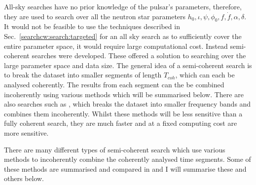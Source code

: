 All-sky searches have no prior knowledge of the pulsar's parameters, therefore,
they are used to search over all the neutron star parameters $h_0, \iota, \psi, \phi_0, f,
\dot{f}, \alpha, \delta$. It would not be feasible to use the techniques described in
Sec.~\ref{searchcw:search:targeted} for an all sky search as to sufficiently
cover the entire parameter space, it would require large computational cost.  Instead
semi-coherent searches were developed.  These offered a solution to searching over
the large parameter space and data size.  The general idea of a semi-coherent
search is to break the dataset into smaller segments of length $T_{coh}$, which
can each be analysed coherently. 
The results from each segment can the be combined incoherently using various methods which will be
summarised below.  
There are also searches such as \citep{messenger2007FastSearch}, which breaks the dataset into smaller frequency bands and combines them incoherently. 
Whilst these methods will be less sensitive than a fully coherent search, they are much faster and at a fixed computing cost are more sensitive.

There are many different types of semi-coherent search which use various
methods to incoherently combine the coherently analysed time segments.  Some of these methods are summarised and compared in
\citep{walsh2016ComparisonMethods} and I will summarise these and others below.


